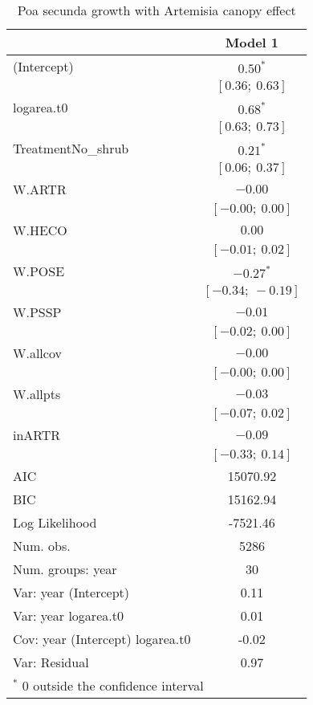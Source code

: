 \documentclass[11pt]{article}
\begin{document}
\begin{table}
\caption{Poa secunda growth with Artemisia canopy effect}
\begin{center}
\begin{tabular}{l c }
\hline
 & Model 1 \\
\hline
(Intercept)                      & $0.50^{*}$        \\
                                 & $[0.36;\ 0.63]$   \\
logarea.t0                       & $0.68^{*}$        \\
                                 & $[0.63;\ 0.73]$   \\
TreatmentNo\_shrub               & $0.21^{*}$        \\
                                 & $[0.06;\ 0.37]$   \\
W.ARTR                           & $-0.00$           \\
                                 & $[-0.00;\ 0.00]$  \\
W.HECO                           & $0.00$            \\
                                 & $[-0.01;\ 0.02]$  \\
W.POSE                           & $-0.27^{*}$       \\
                                 & $[-0.34;\ -0.19]$ \\
W.PSSP                           & $-0.01$           \\
                                 & $[-0.02;\ 0.00]$  \\
W.allcov                         & $-0.00$           \\
                                 & $[-0.00;\ 0.00]$  \\
W.allpts                         & $-0.03$           \\
                                 & $[-0.07;\ 0.02]$  \\
inARTR                           & $-0.09$           \\
                                 & $[-0.33;\ 0.14]$  \\
\hline
AIC                              & 15070.92          \\
BIC                              & 15162.94          \\
Log Likelihood                   & -7521.46          \\
Num. obs.                        & 5286              \\
Num. groups: year                & 30                \\
Var: year (Intercept)            & 0.11              \\
Var: year logarea.t0             & 0.01              \\
Cov: year (Intercept) logarea.t0 & -0.02             \\
Var: Residual                    & 0.97              \\
\hline
\multicolumn{2}{l}{\scriptsize{$^*$ 0 outside the confidence interval}}
\end{tabular}
\label{table:POSEgrowth-inARTR}
\end{center}
\end{table}
\end{document}
